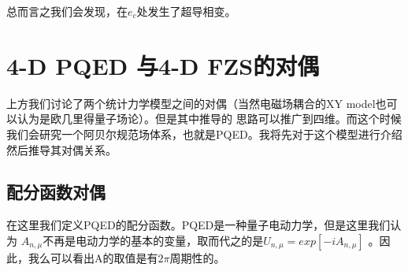 \documentclass{article}
\begin{document}
总而言之我们会发现，在$e_c$处发生了超导相变。


\section{4-D PQED 与4-D FZS的对偶}
上方我们讨论了两个统计力学模型之间的对偶（当然电磁场耦合的XY model也可以认为是欧几里得量子场论）。但是其中推导的
思路可以推广到四维。而这个时候我们会研究一个阿贝尔规范场体系，也就是PQED。我将先对于这个模型进行介绍然后推导其对偶关系。

\subsection{配分函数对偶}
在这里我们定义PQED的配分函数。PQED是一种量子电动力学，但是这里我们认为
$A_{n,\mu}$不再是电动力学的基本的变量，取而代之的是$U_{n,\mu} = exp\left[ -i A_{n,\mu}\right] $
。因此，我么可以看出A的取值是有$2 \pi$周期性的。
\end{document}
